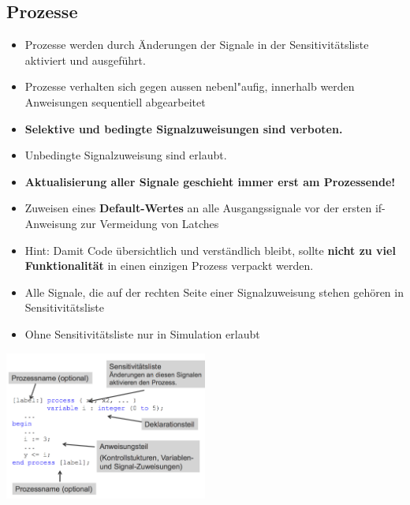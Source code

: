 		
			
		

\newpage
	
		\begin{multicols}{2}
		\subsection{Prozesse}
			\begin{itemize}
			  \setlength{\itemsep}{1pt}
  			  \setlength{\parskip}{0pt}
  			  \setlength{\parsep}{0pt}
				\item Prozesse werden durch Änderungen der Signale in der Sensitivitätsliste aktiviert und ausgeführt.
				\item Prozesse verhalten sich gegen aussen nebenl"aufig, innerhalb werden 
					Anweisungen sequentiell abgearbeitet
				\item \textbf{Selektive und bedingte Signalzuweisungen sind verboten.}
				\item Unbedingte Signalzuweisung sind erlaubt. 
				\item \textbf{Aktualisierung aller Signale geschieht immer erst am 
					Prozessende!}
				\item Zuweisen eines \textbf{Default-Wertes} an alle Ausgangssignale vor 	
					der ersten if-Anweisung zur Vermeidung von Latches 
				\item Hint: Damit Code übersichtlich und verständlich bleibt, sollte 	
					\textbf{nicht zu viel Funktionalität} in einen einzigen Prozess verpackt 
					werden.
				\item Alle Signale, die auf der rechten Seite einer Signalzuweisung stehen 	
					gehören in Sensitivitätsliste 
				\item Ohne Sensitivitätsliste nur in Simulation erlaubt
			\end{itemize}
			\includegraphics[width=0.5\textwidth]{pics/syntaxprozess}
			\columnbreak

\end{multicols}
